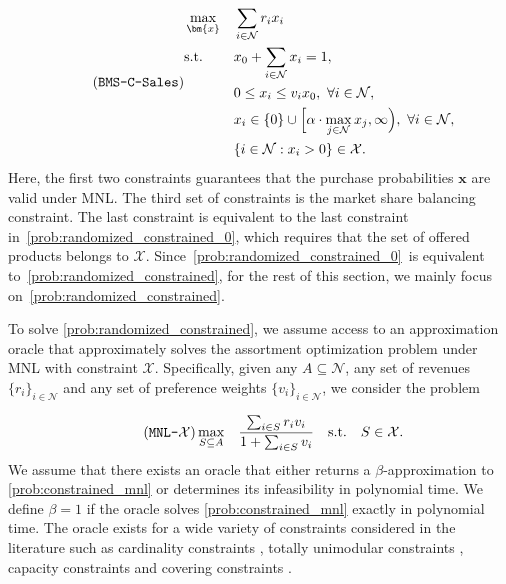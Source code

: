 \documentclass[mnsc,non-blindrev]{informs3}
\theoremstyle{definition}
\begin{document}
\begin{equation}\label{prob:randomized_constrained}
\tag{\texttt{BMS-C-Sales}}
\begin{aligned}
\begin{aligned}
&\max_{\bm{x}} && \sum_{i\in\mathcal{N}}r_ix_i\\
&\textup{s.t.} && x_0+\sum_{i\in\mathcal{N}}x_i=1,\\
&&&0\leq x_i\leq v_ix_0,\ \forall i\in\mathcal{N},\\
&&&x_i\in\{0\}\cup\Big[\alpha\cdot\max_{j\in\mathcal{N}}x_j,\infty\Big),\ \forall i\in\mathcal{N},\\
&&&\{i\in\mathcal{N}:x_i>0\}\in\mathcal{X}.
\end{aligned}
\end{aligned}
\end{equation}
Here, the first two constraints guarantees that the purchase probabilities $\bm{x}$ are valid under MNL. The third set of constraints is the market share balancing constraint. The last constraint is equivalent to the last constraint in~\ref{prob:randomized_constrained_0}, which requires that the set of offered products belongs to $\mathcal{X}$. Since~\ref{prob:randomized_constrained_0}~is equivalent to~\ref{prob:randomized_constrained}, for the rest of this section, we mainly focus on~\ref{prob:randomized_constrained}.

To solve \ref{prob:randomized_constrained}, we assume access to an approximation oracle that approximately solves the assortment optimization problem under MNL with constraint $\mathcal{X}$. Specifically, given any $A\subseteq\mathcal{N}$, any set of revenues $\{r_i\}_{i\in\mathcal{N}}$ and any set of preference weights $\{v_i\}_{i\in\mathcal{N}}$, we consider the problem

\begin{equation}\label{prob:constrained_mnl}
\tag{\texttt{MNL-}$\mathcal{X}$}
\begin{aligned}
&\max_{S\subseteq A}&&\dfrac{\sum_{i\in S}r_iv_i}{1+\sum_{i\in S}v_i} & \text{s.t.} && S\in\mathcal{X}.
\end{aligned}
\end{equation}
We assume that there exists an oracle that either returns a $\beta$-approximation to \ref{prob:constrained_mnl} or determines its infeasibility in polynomial time. We define $\beta=1$ if the oracle solves \ref{prob:constrained_mnl} exactly in polynomial time. The oracle exists for a wide variety of constraints considered in the literature such as cardinality constraints \citep{rusmevichientong2010dynamic}, totally unimodular constraints \citep{sumida2021revenue}, capacity constraints \citep{desir2022capacitated} and covering constraints \citep{housni2024assortment}.
\end{document}
